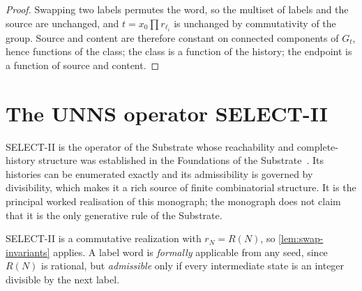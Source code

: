 \begin{proof}
Swapping two labels permutes the word, so the multiset of labels and the source are unchanged, and $t=x_0\prod r_{\ell_i}$ is unchanged by commutativity of the group. Source and content are therefore constant on connected components of $G_t$, hence functions of the class; the class is a function of the history; the endpoint is a function of source and content.
\end{proof}

\section{The UNNS operator SELECT-II}\label{sec:selectII}
SELECT-II is the operator of the Substrate whose reachability and complete-history structure was established in the Foundations of the Substrate~\cite{UNNSFound}. Its histories can be enumerated exactly and its admissibility is governed by divisibility, which makes it a rich source of finite combinatorial structure. It is the principal worked realisation of this monograph; the monograph does not claim that it is the only generative rule of the Substrate.

SELECT-II is a commutative realization with $r_N=R(N)$, so \cref{lem:swap-invariants} applies. A label word is \emph{formally} applicable from any seed, since $R(N)$ is rational, but \emph{admissible} only if every intermediate state is an integer divisible by the next label.

